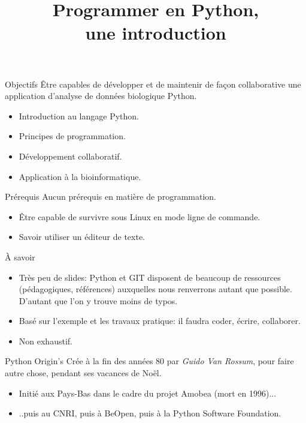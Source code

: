 \documentclass{beamer}
\title{Programmer en Python,\\ une introduction}
\begin{document}
\begin{frame}
  \titlepage
\end{frame}

\begin{frame}{Objectifs}
  Être capables de développer et de maintenir de façon collaborative une application d'analyse de données biologique Python.
  
  \begin{itemize}
  \item Introduction au langage Python.
  \item Principes de programmation.
  \item Développement collaboratif.
  \item Application à la bio\-informatique. 
  \end{itemize}
\end{frame}

\begin{frame}{Prérequis}
  Aucun prérequis en matière de programmation.
  
  \begin{itemize}
  \item Être capable de survivre sous Linux en mode ligne de commande.
  \item Savoir utiliser un éditeur de texte.
  \end{itemize}
\end{frame}

\begin{frame}{À savoir}
  \begin{itemize}
  \item Très peu de slides: Python et GIT disposent de beaucoup de ressources (pédagogiques, références) auxquelles nous renverrons autant que possible. D'autant que l'on y trouve moins de typos.
  \item Basé sur l'exemple et les travaux pratique: il faudra coder, écrire, collaborer.
  \item Non exhaustif.
  \end{itemize}
\end{frame}

\begin{frame}{Python Origin's}
  Crée à la fin des années 80 par {\em Guido Van Rossum}, pour faire autre chose, pendant ses vacances de Noël.
  \begin{itemize}
  \item Initié aux Pays-Bas dans le cadre du projet Amobea (mort en 1996)...
  \item ..puis au CNRI, puis à BeOpen, puis à la Python Software Foundation.
  \end{itemize}
\end{frame}
\end{document}
